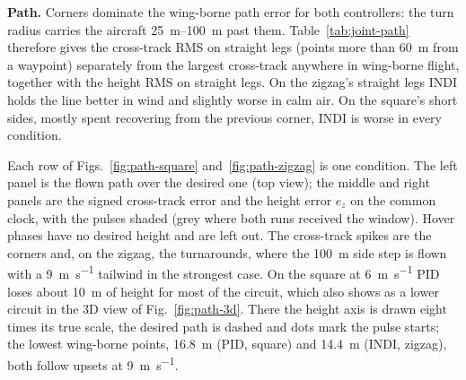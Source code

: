 \documentclass{article}
\begin{document}
\textbf{Path.} Corners dominate the wing-borne path error for both controllers: the turn radius carries the aircraft \SIrange{25}{100}{\meter} past them. Table~\ref{tab:joint-path} therefore gives the cross-track RMS on straight legs (points more than \SI{60}{\meter} from a waypoint) separately from the largest cross-track anywhere in wing-borne flight, together with the height RMS on straight legs. On the zigzag's straight legs INDI holds the line better in wind and slightly worse in calm air. On the square's short sides, mostly spent recovering from the previous corner, INDI is worse in every condition.

\begin{table}[H]
\centering
\caption{Wing-borne path error [\si{\meter}], PID / INDI: in wind INDI holds the zigzag's straight legs better; on the square its cross-track error is larger.}
\label{tab:joint-path}
\end{table}

Each row of Figs.~\ref{fig:path-square} and~\ref{fig:path-zigzag} is one condition. The left panel is the flown path over the desired one (top view); the middle and right panels are the signed cross-track error and the height error $e_z$ on the common clock, with the pulses shaded (grey where both runs received the window). Hover phases have no desired height and are left out. The cross-track spikes are the corners and, on the zigzag, the turnarounds, where the \SI{100}{\meter} side step is flown with a \SI{9}{\meter\per\second} tailwind in the strongest case. On the square at \SI{6}{\meter\per\second} PID loses about \SI{10}{\meter} of height for most of the circuit, which also shows as a lower circuit in the 3D view of Fig.~\ref{fig:path-3d}. There the height axis is drawn eight times its true scale, the desired path is dashed and dots mark the pulse starts; the lowest wing-borne points, \SI{16.8}{\meter} (PID, square) and \SI{14.4}{\meter} (INDI, zigzag), both follow upsets at \SI{9}{\meter\per\second}.
\end{document}
